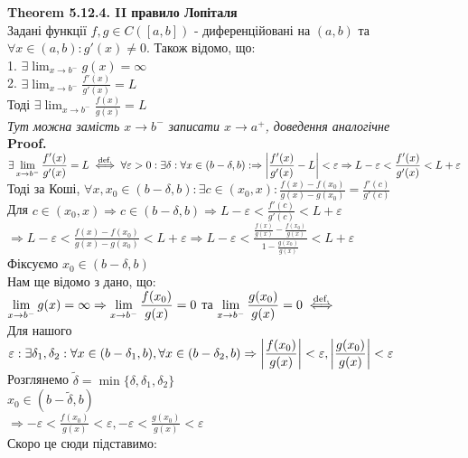 \documentclass[a4paper, 14pt]{extarticle}
\def\huge{\displaystyle}
\def\th#1{\textbf{Theorem {#1}}}
\def\proof{\textbf{Proof.}\\}
\begin{document}
\th{5.12.4. II правило Лопіталя}\\
Задані функції $f,g \in C([a,b])$ - диференційовані на $(a,b)$ та $\forall x \in (a,b): g'(x) \neq 0$. Також відомо, що:\\
1. $\exists \huge \lim_{x \to b^-} g(x) = \infty$\\
2. $\exists \huge \lim_{x \to b^-} \frac{f'(x)}{g'(x)} = L$\\
Тоді $\exists \huge \lim_{x \to b^-} \frac{f(x)}{g(x)} = L$\\
\textit{Тут можна замість $x \to b^-$ записати $x \to a^+$, доведення аналогічне}\\
\proof
$\exists \huge \lim_{x \to b^-} \frac{f'(x)}{g'(x)} = L \overset{\textrm{def.}}{\iff} \forall \varepsilon > 0: \exists \delta: \forall x \in (b-\delta,b): \Rightarrow \abs{\frac{f'(x)}{g'(x)} - L} < \varepsilon \Rightarrow L-\varepsilon < \frac{f'(x)}{g'(x)} < L+\varepsilon$\\
Тоді за Коші, $\forall x,x_0 \in (b-\delta, b): \exists c \in (x_0,x): \huge \frac{f(x)-f(x_0)}{g(x)-g(x_0)} = \frac{f'(c)}{g'(c)}$\\
Для $\huge c \in (x_0,x) \Rightarrow c \in (b-\delta, b) \Rightarrow L-\varepsilon < \frac{f'(c)}{g'(c)} < L+\varepsilon$\\
$\Rightarrow \huge L-\varepsilon <\frac{f(x)-f(x_0)}{g(x)-g(x_0)} < L+\varepsilon \Rightarrow L-\varepsilon <\frac{\frac{f(x)}{g(x)}-\frac{f(x_0)}{g(x)}}{1 - \frac{g(x_0)}{g(x)}} < L+\varepsilon$\\
Фіксуємо $x_0 \in (b-\delta, b)$\\
Нам ще відомо з дано, що: \\ $\huge \huge \lim_{x \to b^-} g(x) = \infty \Rightarrow \huge \lim_{x \to b^-} \frac{f(x_0)}{g(x)} = 0$ та $\huge \huge \lim_{x \to b^-} \frac{g(x_0)}{g(x)} = 0 \overset{\textrm{def.}}{\iff} $\\
Для нашого $\varepsilon: \exists \delta_1, \delta_2: \forall x \in (b-\delta_1, b), \forall x \in (b-\delta_2, b) \\ \Rightarrow \huge \abs{\frac{f(x_0)}{g(x)}}<\varepsilon, \abs{\frac{g(x_0)}{g(x)}}<\varepsilon$\\
Розглянемо $\tilde{\delta} = \min\{\delta, \delta_1, \delta_2 \}$\\
$x_0 \in (b-\tilde{\delta},b)$\\
$\Rightarrow \huge -\varepsilon<\frac{f(x_0)}{g(x)}<\varepsilon, -\varepsilon<\frac{g(x_0)}{g(x)}<\varepsilon$\\
Скоро це сюди підставимо:\\
\end{document}

